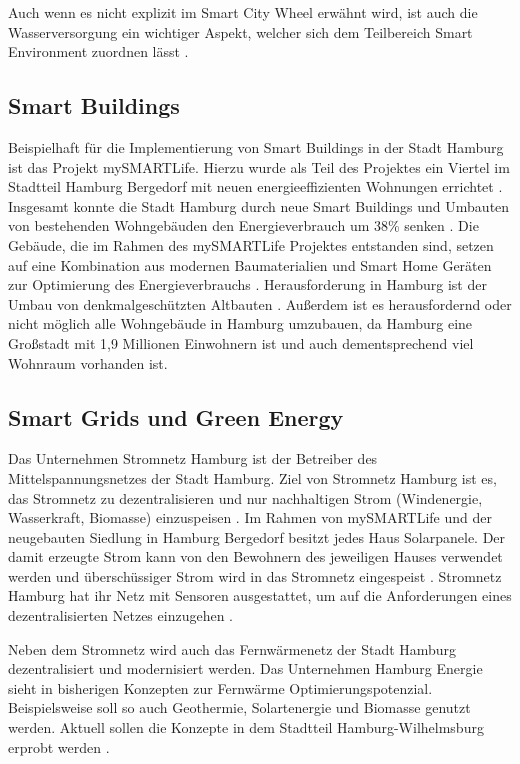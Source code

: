 Auch wenn es nicht explizit im Smart City Wheel erwähnt wird, ist auch die Wasserversorgung ein wichtiger Aspekt, welcher sich dem Teilbereich Smart Environment zuordnen lässt \autocite[vgl.][]{Dickey.2018}.

\subsection{Smart Buildings}
Beispielhaft für die Implementierung von Smart Buildings in der Stadt Hamburg ist das Projekt mySMARTLife.
Hierzu wurde als Teil des Projektes ein Viertel im Stadtteil Hamburg Bergedorf mit neuen energieeffizienten Wohnungen errichtet \autocite[vgl.][S. 2ff.]{Hamburg.OD}.
Insgesamt konnte die Stadt Hamburg durch neue Smart Buildings und Umbauten von bestehenden Wohngebäuden den Energieverbrauch um 38\% senken \autocite[vgl.][]{Hamburg.ODB}.
Die Gebäude, die im Rahmen des mySMARTLife Projektes entstanden sind, setzen auf eine Kombination aus modernen Baumaterialien und Smart Home Geräten zur Optimierung des Energieverbrauchs \autocite[vgl.][S. 2ff.]{Hamburg.OD}.
Herausforderung in Hamburg ist der Umbau von denkmalgeschützten Altbauten \autocite[vgl.][]{Hamburg.ODA}.
Außerdem ist es herausfordernd oder nicht möglich alle Wohngebäude in Hamburg umzubauen, da Hamburg eine Großstadt mit 1,9 Millionen Einwohnern ist und auch dementsprechend viel Wohnraum vorhanden ist.


\subsection{Smart Grids und Green Energy}
Das Unternehmen  Stromnetz Hamburg ist der Betreiber des Mittelspannungsnetzes der Stadt Hamburg.
Ziel von  Stromnetz Hamburg ist es, das Stromnetz zu dezentralisieren und nur nachhaltigen Strom (Windenergie, Wasserkraft, Biomasse) einzuspeisen \autocite[vgl.][]{StromnetzHamburg.OD}.
Im Rahmen von mySMARTLife und der neugebauten Siedlung in Hamburg Bergedorf besitzt jedes Haus Solarpanele.
Der damit erzeugte Strom kann von den Bewohnern des jeweiligen Hauses verwendet werden und überschüssiger Strom wird in das Stromnetz eingespeist \autocite[vgl.][S. 9]{Hamburg.OD}.
Stromnetz Hamburg hat ihr Netz mit Sensoren ausgestattet, um auf die Anforderungen eines dezentralisierten Netzes einzugehen \autocite[vgl.][]{StromnetzHamburg.OD}.

Neben dem Stromnetz wird auch das Fernwärmenetz der Stadt Hamburg dezentralisiert und modernisiert werden.
Das Unternehmen Hamburg Energie sieht in bisherigen Konzepten zur Fernwärme Optimierungspotenzial.
Beispielsweise soll so auch Geothermie, Solartenergie und Biomasse genutzt werden.
Aktuell sollen die Konzepte in dem Stadtteil Hamburg-Wilhelmsburg erprobt werden \autocite[][]{HamburgEnergie.OD}.

